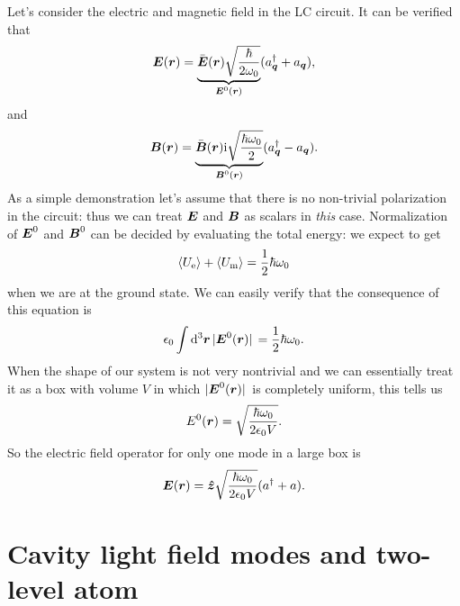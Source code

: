 \documentclass[hyperref, a4paper]{article}
\newcommand*{\ii}{\mathrm{i}}
\begin{document}
Let's consider the electric and magnetic field in the LC circuit.
It can be verified that 
\begin{equation}
    \vb*{E}(\vb*{r}) = \underbrace{
        \bar{\vb*{E}}(\vb*{r})  \sqrt{
        \frac{\hbar}{2 \omega_0}
        }
    }_{\vb*{E}^0(\vb*{r})} (a^\dagger_{\vb*{q}} + a_{\vb*{q}}),
\end{equation}
and 
\begin{equation}
    \vb*{B}(\vb*{r}) = \underbrace{
        \bar{\vb*{B}}(\vb*{r}) \ii \sqrt{
            \frac{\hbar \omega_0}{2} 
        } 
    }_{\vb*{B}^0(\vb*{r})} ( 
        a^\dagger_{\vb*{q}} - a_{\vb*{q}}
    ).
\end{equation}
As a simple demonstration let's assume that 
there is no non-trivial polarization in the circuit:
thus we can treat $\vb*{E}$ and $\vb*{B}$ as scalars 
in \emph{this} case.
Normalization of $\vb*{E}^0$ and $\vb*{B}^0$ 
can be decided by evaluating the total energy:
we expect to get 
\begin{equation}
    \expval{U_\text{e}} + \expval{U_\text{m}} = \frac{1}{2} \hbar \omega_0    
\end{equation}
when we are at the ground state.
We can easily verify that the consequence of this equation is 
\begin{equation}
    \epsilon_0 \int \dd[3]{\vb*{r}} \abs*{\vb*{E}^0(\vb*{r})} = \frac{1}{2} \hbar \omega_0.
\end{equation}
When the shape of our system is not very nontrivial and we can essentially treat it 
as a box with volume $V$ in which $\abs*{\vb*{E}^0(\vb*{r})}$
is completely uniform, this tells us 
\begin{equation}
    E^0(\vb*{r}) = \sqrt{\frac{\hbar \omega_0}{2 \epsilon_0 V}}.
\end{equation}
So the electric field operator for only one mode in a large box is 
\begin{equation}
    \vb*{E}(\vb*{r}) = \vu*{z} \sqrt{\frac{\hbar \omega_0}{2 \epsilon_0 V}} (a^\dagger + a).
    \label{eq:electric-field-one-mode}
\end{equation}

\section{Cavity light field modes and two-level atom}
\end{document}
